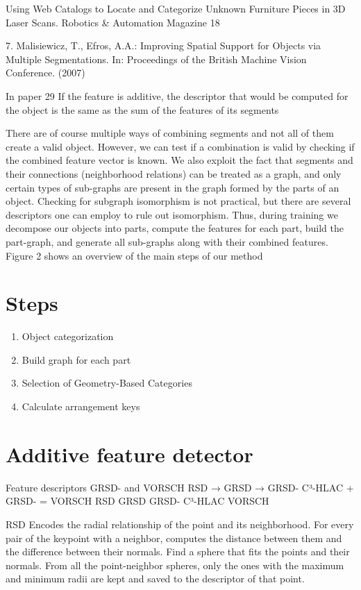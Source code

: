 \documentclass[runningheads,a4paper]{llncs}
\begin{document}
{ Using Web Catalogs to Locate and Categorize Unknown Furniture Pieces in 3D
Laser Scans.  Robotics & Automation Magazine
18

7.  Malisiewicz, T., Efros, A.A.:  Improving Spatial Support for Objects via Multiple
Segmentations.  In: Proceedings of the British Machine Vision Conference. (2007)


In paper 29
If the feature is additive, the descriptor that would be computed for the object is
the same as the sum of the features of its segments

There are of course multiple ways of combining segments and not all of them
create a valid object. However, we can test if a combination is valid by checking if
the combined feature vector is known. We also exploit the fact that segments and
their connections (neighborhood relations) can be treated as a graph, and only
certain types of sub-graphs are present in the graph formed by the parts of an
object. Checking for subgraph isomorphism is not practical, but there are several
descriptors one can employ to rule out isomorphism. Thus, during training we
decompose  our  objects  into  parts,  compute  the  features  for  each  part,  build
the part-graph, and generate all sub-graphs along with their combined features.
Figure 2 shows an overview of the main steps of our method

\section{Steps}
\begin{enumerate}
    \item Object categorization
    \item Build graph for each part
    \item Selection of Geometry-Based Categories
    \item Calculate arrangement keys
\end{enumerate}

\section{Additive feature detector}

Feature descriptors
GRSD- and VORSCH
RSD → GRSD → GRSD-
C³-HLAC + GRSD- = VORSCH
RSD
GRSD
GRSD-
C³-HLAC
VORSCH

RSD
Encodes the radial relationship of the point and its neighborhood. 
For every pair of the keypoint with a neighbor, computes the distance between them and the difference between their normals. 
Find a sphere that fits the points and their normals.
From all the point-neighbor spheres, only the ones with the maximum and minimum radii are kept and saved to the descriptor of that point. 

}
\end{document}
